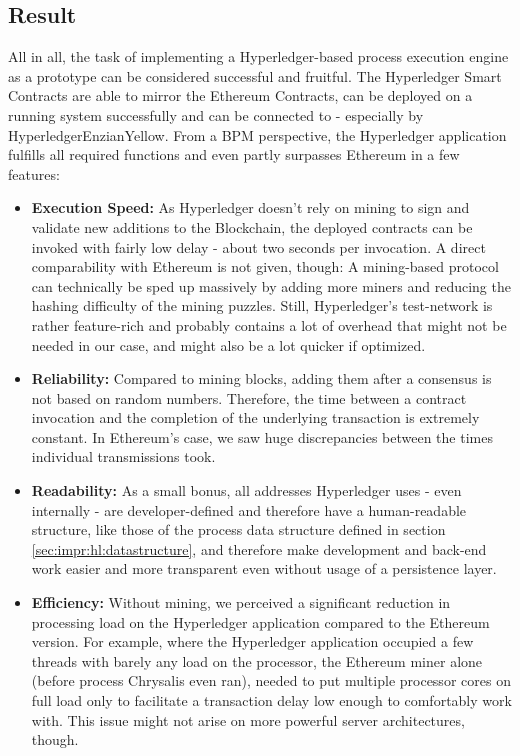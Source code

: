 \subsection{Result}
\label{sec:impr:hl:result}

All in all, the task of implementing a Hyperledger-based process execution engine as a prototype can be considered successful and fruitful. The Hyperledger Smart Contracts are able to mirror the Ethereum Contracts, can be deployed on a running system successfully and can be connected to - especially by HyperledgerEnzianYellow. From a BPM perspective, the Hyperledger application fulfills all required functions and even partly surpasses Ethereum in a few features:
\begin{itemize}
    \item \textbf{Execution Speed:} As Hyperledger doesn't rely on mining to sign and validate new additions to the Blockchain, the deployed contracts can be invoked with fairly low delay - about two seconds per invocation. A direct comparability with Ethereum is not given, though: A mining-based protocol can technically be sped up massively by adding more miners and reducing the hashing difficulty of the mining puzzles. Still, Hyperledger's test-network is rather feature-rich and probably contains a lot of overhead that might not be needed in our case, and might also be a lot quicker if optimized.
    \item \textbf{Reliability:} Compared to mining blocks, adding them after a consensus is not based on random numbers. Therefore, the time between a contract invocation and the completion of the underlying transaction is extremely constant. In Ethereum's case, we saw huge discrepancies between the times individual transmissions took.
    \item \textbf{Readability:} As a small bonus, all addresses Hyperledger uses - even internally - are developer-defined and therefore have a human-readable structure, like those of the process data structure defined in section \ref{sec:impr:hl:datastructure}, and therefore make development and back-end work easier and more transparent even without usage of a persistence layer.
    \item \textbf{Efficiency:} Without mining, we perceived a significant reduction in processing load on the Hyperledger application compared to the Ethereum version. For example, where the Hyperledger application occupied a few threads with barely any load on the processor, the Ethereum miner alone (before process Chrysalis even ran), needed to put multiple processor cores on full load only to facilitate a transaction delay low enough to comfortably work with. This issue might not arise on more powerful server architectures, though.
\end{itemize}